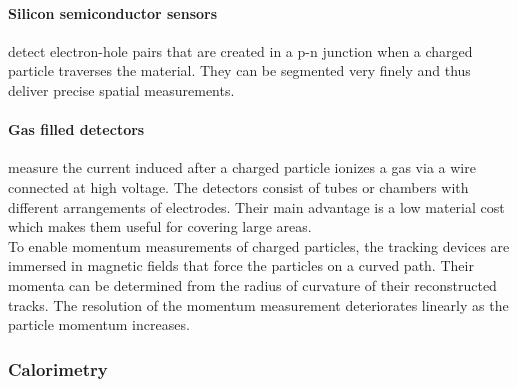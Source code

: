 \paragraph{Silicon semiconductor sensors} detect electron-hole pairs that are created in a p-n junction when a charged particle traverses the material. They can be segmented very finely and thus deliver precise spatial measurements.
\paragraph{Gas filled detectors} measure the current induced after a charged particle ionizes a gas via a wire connected at high voltage. The detectors consist of tubes or chambers with different arrangements of electrodes. Their main advantage is a low material cost which makes them useful for covering large areas. \\
\newline
To enable momentum measurements of charged particles, the tracking devices are immersed in magnetic fields that force the particles on a curved path. Their momenta can be determined from the radius of curvature of their reconstructed tracks. The resolution of the momentum measurement deteriorates linearly as the particle momentum increases.

\subsubsection{Calorimetry}

